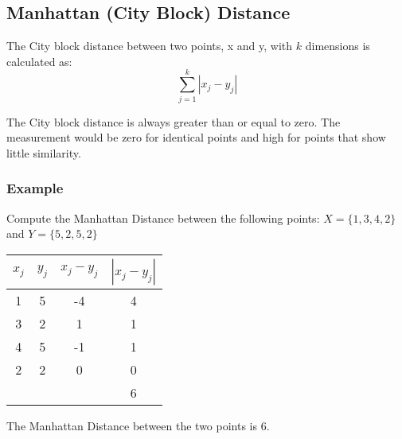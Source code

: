 \documentclass[12pt]{article}
\begin{document}
\subsection{Manhattan (City Block) Distance}
The City block distance between two points, x and y, with $k$ dimensions is calculated as:
\[ \sum^{k}_{j=1} | x_j - y_j |  \]

\noindent The City block distance is always greater than or equal to zero. The measurement would be zero for identical points and high for points that show little similarity.

\subsubsection{{\large Example}}
Compute the Manhattan Distance between the following points: 
$X = \{1,3,4,2\}$ and $Y = \{5,2,5,2\}$


\begin{center}
	\begin{tabular}{|c|c|c|c|}
		\hline
		$x_j$	&	$y_j$	&   $x_j - y_j$	&	$| x_j - y_j |$	\\ \hline
		1	&	5	&	-4	&	4	\\
		3	&	2	&	1	&	1	\\
		4	&	5	&	-1	&	1	\\
		2	&	2	&	0	&	0	\\ \hline
		& & & 6 \\
		\hline
	\end{tabular}
\end{center}
The Manhattan Distance between the two points is 6.
\newpage
\end{document}

